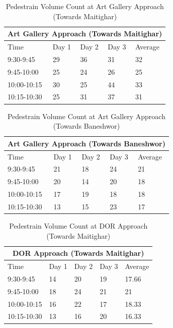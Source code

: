 \begin{table}[h!]
    \centering
    \caption{ Pedestrain Volume Count at Art Gallery Approach (Towards Maitighar) }
    \begin{tabular}{|l|l|l|l|l|}
        \hline
        \multicolumn{5}{|c|}{ \textbf{Art Gallery Approach (Towards Maitighar) } } \\
        \hline
        Time	&Day 1	&Day 2	&Day 3	&Average \\ \hline
        9:30-9:45	&29	&36	&31	&32 \\ \hline
        9:45-10:00	&25	&24	&26	&25 \\ \hline
        10:00-10:15	&30	&25	&44	&33 \\ \hline
        10:15-10:30	&25	&31	&37	&31 \\ \hline

    \end{tabular}
\end{table}

\begin{table}[h!]
    \centering
    \caption{ Pedestrain Volume Count at Art Gallery Approach (Towards Baneshwor) } 
    \begin{tabular}{|l|l|l|l|l|}
        \hline
        \multicolumn{5}{|c|}{ \textbf{Art Gallery Approach (Towards Baneshwor) } } \\
        \hline
        Time	&Day 1	&Day 2	&Day 3	&Average \\ \hline
        9:30-9:45	&21	&18	&24	&21 \\ \hline
        9:45-10:00	&20	&14	&20	&18 \\ \hline
        10:00-10:15	&17	&19	&18	&18 \\ \hline
        10:15-10:30	&13	&15	&23	&17 \\ \hline

    \end{tabular}
\end{table}

\begin{table}[h!]
    \centering
    \caption{ Pedestrain Volume Count at DOR Approach (Towards Maitighar) } 
    \begin{tabular}{|l|l|l|l|l|}
        \hline
        \multicolumn{5}{|c|}{ \textbf{DOR Approach (Towards Maitighar) } } \\
        \hline
        Time	&Day 1	&Day 2	&Day 3	&Average \\ \hline
        9:30-9:45	&14	&20	&19	&17.66 \\ \hline
        9:45-10:00	&18	&24	&21	&21 \\ \hline
        10:00-10:15	&16	&22	&17	&18.33 \\ \hline
        10:15-10:30	&13	&16	&20	&16.33 \\ \hline
    \end{tabular}
\end{table}

